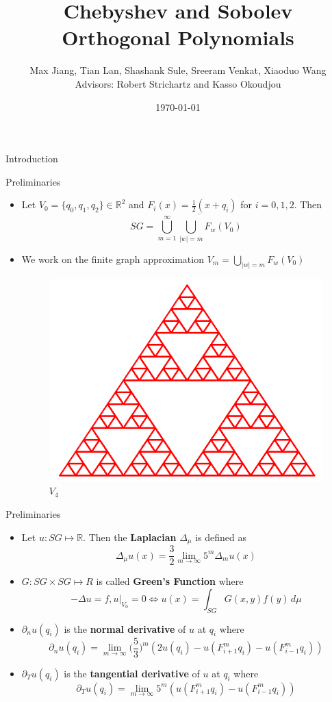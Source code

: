 \documentclass[xcolor = dvipsnames]{beamer}
\title{Chebyshev and Sobolev Orthogonal Polynomials}
\author{Max Jiang, Tian Lan, Shashank Sule, Sreeram Venkat, Xiaoduo Wang\\Advisors: Robert Strichartz and Kasso Okoudjou}
\institute{Cornell SPUR 2019: Analysis on Fractals}%
\date{\today}
\begin{document}
\begin{frame}
  \titlepage
\end{frame}

\begin{section}{Introduction}
\begin{frame}{Preliminaries}
\begin{itemize}
    \item Let $V_0 = \{q_0, q_1, q_2\} \in \mathbb{R}^2$ and $F_i(x) = \frac{1}{2}(x+q_i)$ for $i=0,1,2$. Then $$SG = \overline{\bigcup_{m=1}^{\infty}\bigcup_{|w|=m}F_w(V_0)}$$
    \pause
    \item We work on the finite graph approximation $V_m = \bigcup_{|w|=m}F_{w}(V_0)$
    \begin{figure}
        \centering
        \includegraphics[width=0.45\linewidth]{Final_presentation/images/V4.png}
        \caption{$V_4$}
        \label{fig:V4}
    \end{figure}
\end{itemize}
\end{frame}

\begin{frame}{Preliminaries}
    \begin{itemize}
        \item Let $u: SG \mapsto \mathbb{R}$. Then the \textbf{Laplacian} $\Delta_{\mu}$ is defined as
        $$  \Delta_{\mu}u(x) = \frac{3}{2}\lim_{m \to \infty}5^m\Delta_mu(x)$$
        \pause
        \item $G: SG \times SG \mapsto R$ is called \textbf{Green's Function} where
        $$ -\Delta u = f, u|_{V_0} = 0 \iff u(x) = \int_{SG}G(x,y)f(y)\,d\mu$$
        \pause
        \item $\partial_nu(q_i)$ is the \textbf{normal derivative} of $u$ at $q_i$ where
        $$ \partial_nu(q_i) = \lim_{m \to \infty}\Big(\frac{5}{3}\Big)^m(2u(q_i) - u(F^{m}_{i+1}q_i) - u(F^{m}_{i-1}q_i))$$
        \pause
        \item $\partial_Tu(q_i)$ is the \textbf{tangential derivative} of $u$ at $q_i$ where
        $$ \partial_{T}u(q_i) = \lim_{m\to\infty}5^m(u(F^{m}_{i+1}q_i) - u(F^{m}_{i-1}q_i))$$
        

\end{itemize}
\end{frame}
\end{section}
\end{document}
